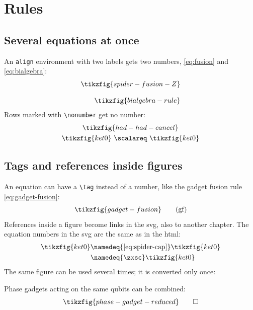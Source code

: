 \chapter{Rules}\label{ch:rules}

\section{Several equations at once}

An \texttt{align} environment with two labels gets two numbers, \eqref{eq:fusion} and \eqref{eq:bialgebra}:
\begin{align}
  \label{eq:fusion}
  \tikzfig{spider-fusion-Z} \\[3mm]
  \label{eq:bialgebra}
  \tikzfig{bialgebra-rule}
\end{align}
Rows marked with \verb|\nonumber| get no number:
\begin{gather}
  \tikzfig{had-had-cancel} \nonumber \\
  \tikzfig{ket0} \ \scalareq\ \tikzfig{ket0}
\end{gather}

\section{Tags and references inside figures}

An equation can have a \verb|\tag| instead of a number, like the gadget fusion rule \eqref{eq:gadget-fusion}:
\begin{equation}\label{eq:gadget-fusion}
  \tikzfig{gadget-fusion}
  \tag{gf}
\end{equation}
References inside a figure become links in the svg, also to another chapter. The equation numbers in the svg are
the same as in the html:
\begin{align*}
  \tikzfig{ket0}
  &\namedeq{\eqref{eq:spider-cap}} \tikzfig{ket0} \\
  &\namedeq{\zxsc} \tikzfig{ket0}
\end{align*}
The same figure can be used several times; it is converted only once:

\begin{theorem}
  Phase gadgets acting on the same qubits can be combined:
  \[
    \tikzfig{phase-gadget-reduced} \qedhere
  \]
\end{theorem}
